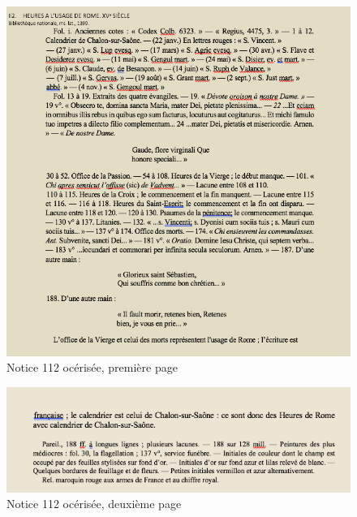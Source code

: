 \documentclass[a4paper,12pt,twoside]{book}
\begin{document}
    
    \begin{figure}[!h]
    \centering
    \includegraphics[width=15cm]{img/Notices_Leroquais/Notice112/OCR/NoticeOCR_112_1.png}
    \caption{Notice 112 océrisée, première page}
    \end{figure}
    \clearpage
    
    \begin{figure}[!h]
    \centering
    \includegraphics[width=15cm]{img/Notices_Leroquais/Notice112/OCR/noticeOCR_112_2.png}
    \caption{Notice 112 océrisée, deuxième page}
    \end{figure}
    \clearpage
    
    
\end{document}
